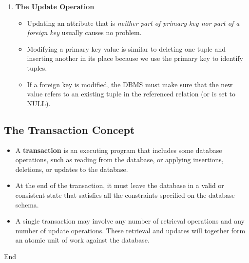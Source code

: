 \documentclass[10pt]{article}
\begin{document}
\begin{enumerate}
	\item \textbf{The Update Operation}
	\begin{itemize}
		\item Updating an attribute that is \textit{neither part of primary key nor part of a foreign key} usually causes no problem.
		\item Modifying a primary key value is similar to deleting one tuple and inserting another in its place because we use the primary key to identify tuples.
		\item If a foreign key is modified, the DBMS must make sure that the new value refers to an existing tuple in the referenced relation (or is set to NULL).
	\end{itemize}
\end{enumerate}

\subsection{The Transaction Concept}
\begin{itemize}
	\item A \textbf{transaction} is an executing program that includes some database operations, such as reading from the database, or applying insertions, deletions, or updates to the database.
	\item At the end of the transaction, it must leave the database in a valid or consistent state that satisfies all the constraints specified on the database schema.
	\item A single transaction may involve any number of retrieval operations and any number of update operations. These retrieval and updates will together form an atomic unit of work against the database.
\end{itemize}

\begin{center}
	End
\end{center}

\pagebreak
\end{document}
